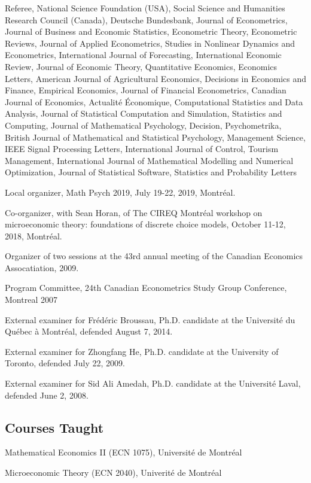 \documentclass[12pt]{article}
\begin{document}
Referee,
National Science Foundation (USA),
Social Science and Humanities Research Council (Canada),
Deutsche Bundesbank,
Journal of Econometrics,
Journal of Business and Economic Statistics,
Econometric Theory,
Econometric Reviews,
Journal of Applied Econometrics,
Studies in Nonlinear Dynamics and Econometrics,
International Journal of Forecasting,
International Economic Review,
Journal of Economic Theory,
Quantitative Economics,
Economics Letters,
American Journal of Agricultural Economics,
Decisions in Economics and Finance,
Empirical Economics,
Journal of Financial Econometrics,
Canadian Journal of Economics,
Actualit\'e \'Economique,
Computational Statistics and Data Analysis,
Journal of Statistical Computation and Simulation,
Statistics and Computing,
Journal of Mathematical Psychology,
Decision,
Psychometrika,
British Journal of Mathematical and Statistical Psychology,
Management Science,
IEEE Signal Processing Letters,
International Journal of Control,
Tourism Management,
International Journal of Mathematical Modelling and Numerical Optimization,
Journal of Statistical Software,
Statistics and Probability Letters

Local organizer, Math Psych 2019, July 19-22, 2019, Montr\'eal.

Co-organizer, with Sean Horan, of 
The CIREQ Montr\'eal workshop on microeconomic theory: foundations of discrete choice models, October 11-12, 2018, Montr\'eal.

Organizer of two sessions at the 43rd annual meeting of the Canadian Economics Assocatiation, 2009.

Program Committee, 24th Canadian Econometrics Study Group Conference, Montreal 2007

External examiner for Fr\'ed\'eric Broussau,
Ph.D. candidate at the Universit\'e du Qu\'ebec \`a Montr\'eal,
defended August 7, 2014.

External examiner for Zhongfang He,
Ph.D. candidate at the University of Toronto,
defended July 22, 2009.

External examiner for Sid Ali Amedah,
Ph.D. candidate at the Universit\'e Laval,
defended June 2, 2008.

\subsection*{Courses Taught}

Mathematical Economics II (ECN 1075), Universit\'e de Montr\'eal

Microeconomic Theory (ECN 2040), Univerit\'e de Montr\'eal
\end{document}
